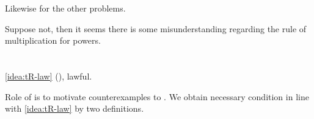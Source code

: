 \begin{note}
\begin{illustration}[Textbook]
    Likewise for the other problems.
  \end{illustration}

  Suppose not, then it seems there is some misunderstanding regarding the rule of multiplication for powers.
\end{note}

\section{}
\label{cha:typical:sec:tR}

\begin{note}
  \autoref{idea:tR-law} (), lawful.

  Role of \tC{} is to motivate counterexamples to \issueConstraint{}.
  We obtain necessary condition in line with \autoref{idea:tR-law} by two definitions.
\end{note}

\subsection{}
\label{sec:ptr0}

